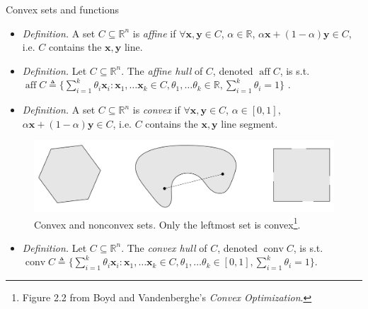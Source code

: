 \documentclass{beamer}
\numberwithin{equation}{section}
\begin{document}
\begin{frame}{Convex sets and functions}
    \begin{itemize}
        \item
        \textit{Definition.} A set $ C \subseteq \mathbb{R}^n $ is
        \textit{affine} if $ \forall \mathbf{x}, \mathbf{y} \in C $,
        $ \alpha \in \mathbb{R} $, $ \alpha\mathbf{x} + (1 - \alpha)\mathbf{y}
        \in C $, i.e. $ C $ contains the $ \mathbf{x}, \mathbf{y} $ line.

        \item
        \textit{Definition.} Let $ C \subseteq \mathbb{R}^n $. The
        \textit{affine hull} of $ C $, denoted $ \operatorname{aff} C $, is
        s.t. $ \operatorname{aff} C \triangleq \{
            \sum_{i = 1}^k\theta_i\mathbf{x}_i : \mathbf{x}_1, \ldots
            \mathbf{x}_k \in C, \theta_1, \ldots \theta_k \in \mathbb{R},
            \sum_{i = 1}^k\theta_i = 1
        \} $ \cite{bv_convex_opt}.

        \item
        \textit{Definition.} A set $ C \subseteq \mathbb{R}^n $ is
        \textit{convex} if $ \forall \mathbf{x}, \mathbf{y} \in C $,
        $ \alpha \in [0, 1] $,
        $ \alpha\mathbf{x} + (1 - \alpha)\mathbf{y} \in C $, i.e. $ C $
        contains the $ \mathbf{x}, \mathbf{y} $ line segment.
    \end{itemize}
    \begin{figure}
        \centering
        \includegraphics[scale = 0.2]{bv_fig_2.2.png}
        \vspace{-10 pt}
        \caption{
            Convex and nonconvex sets. Only the leftmost set is
            convex\footnote{
                Figure 2.2 from Boyd and Vandenberghe's
                \textit{Convex Optimization}.
            }.
        }
        \vspace{-10 pt}
    \end{figure}
    \begin{itemize}
        \item
        \textit{Definition.} Let $ C \subseteq \mathbb{R}^n $. The
        \textit{convex hull} of $ C $, denoted $ \operatorname{conv} C $, is
        s.t. $ \operatorname{conv} C \triangleq \{
            \sum_{i = 1}^k\theta_i\mathbf{x}_i : \mathbf{x}_1, \ldots
            \mathbf{x}_k \in C, \theta_1, \ldots \theta_k \in [0, 1],
            \sum_{i = 1}^k\theta_i = 1        
        \} $.
    \end{itemize}
    \bigskip
\end{frame}
\end{document}
